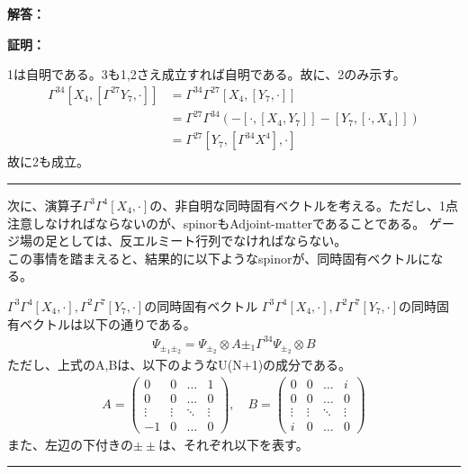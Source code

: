 \documentclass[dvipdfmx,a4paper,10.5pt]{article}
\numberwithin{equation}{section}
\newenvironment{proofbox}
{\begin{prooflabel}\textbf{証明：}\end{prooflabel}\vspace{0.8em}}
{\par\vspace{1em}\hrule\vspace{1em}}
\newenvironment{answerbox}
{\begin{prooflabel}\textbf{解答：}\end{prooflabel}\vspace{0.8em}}
{\par\vspace{1em}\hrule\vspace{1em}}
\begin{document}
\begin{answerbox}
    \begin{proofbox}
        1は自明である。3も1,2さえ成立すれば自明である。故に、2のみ示す。
        \begin{align*}
            \Gamma^{34}[X_{4},[\Gamma^{27}Y_{7},\cdot]]
            &=\Gamma^{34}\Gamma^{27}[X_{4},[Y_{7},\cdot]]\\
            &=\Gamma^{27}\Gamma^{34}(-[\cdot,[X_{4},Y_{7}]]-[Y_{7},[\cdot,X_{4}]])\\
            &=\Gamma^{27}[Y_{7},[\Gamma^{34}X^{4}],\cdot]
        \end{align*}
        故に2も成立。
    \end{proofbox}
    次に、演算子$\Gamma^{3}\Gamma^{4}[X_{4},\cdot]$の、非自明な同時固有ベクトルを考える。ただし、1点注意しなければならないのが、spinorもAdjoint-matterであることである。
    ゲージ場の足としては、反エルミート行列でなければならない。\\
    この事情を踏まえると、結果的に以下ようなspinorが、同時固有ベクトルになる。
    \begin{resultbox}{$\Gamma^{3}\Gamma^{4}[X_{4},\cdot],\Gamma^{2}\Gamma^{7}[Y_{7},\cdot]$の同時固有ベクトル}
        $\Gamma^{3}\Gamma^{4}[X_{4},\cdot],\Gamma^{2}\Gamma^{7}[Y_{7},\cdot]$の同時固有ベクトルは以下の通りである。
        \begin{align*}
            \Psi_{\pm_{1}\pm_{2}}=\Psi_{\pm_{2}}\otimes A
            \pm_{1}\Gamma^{34}\Psi_{\pm_{2}} \otimes B
        \end{align*}
        ただし、上式のA,Bは、以下のようなU(N+1)の成分である。
        \begin{align*}
            A=\begin{pmatrix}
                0 & 0& \dots & 1\\
                0 & 0& \dots & 0\\
                \vdots & \vdots & \ddots & \vdots \\
                -1 & 0 & \dots & 0
            \end{pmatrix},\quad B=\begin{pmatrix}
                0 & 0& \dots & i\\
                0 & 0& \dots & 0\\
                \vdots &\vdots &\ddots & \vdots \\
                i & 0 & \dots & 0
            \end{pmatrix}
        \end{align*}
        また、左辺の下付きの$\pm\pm$は、それぞれ以下を表す。

\end{resultbox}
\end{answerbox}
\end{document}
